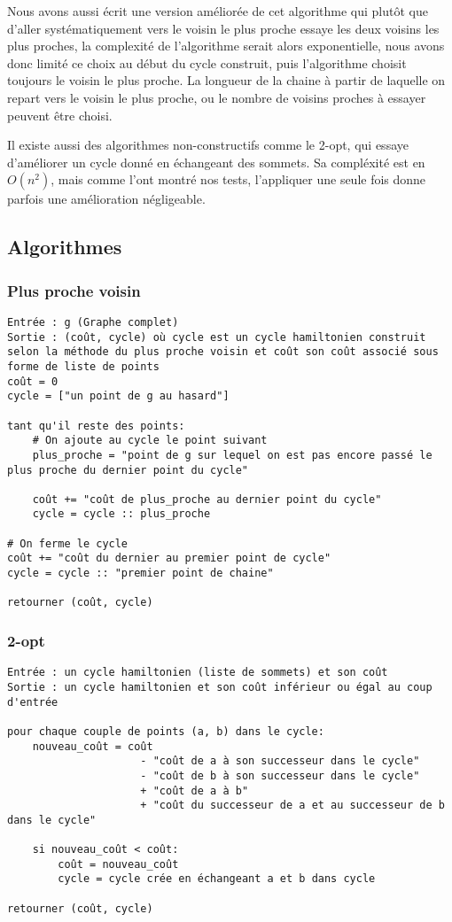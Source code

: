 \documentclass{scrartcl}
\begin{document}
    Nous avons aussi écrit une version améliorée de cet algorithme qui plutôt
    que d'aller systématiquement vers le voisin le plus proche essaye les deux
    voisins les plus proches, la complexité de l'algorithme serait alors
    exponentielle, nous avons donc limité ce choix au début du cycle construit,
    puis l'algorithme choisit toujours le voisin le plus proche. La longueur de
    la chaine à partir de laquelle on repart vers le voisin le plus proche, ou
    le nombre de voisins proches à essayer peuvent être choisi.

    Il existe aussi des algorithmes non-constructifs comme le 2-opt, qui essaye
    d'améliorer un cycle donné en échangeant des sommets. Sa compléxité est en
    $O(n^2)$, mais comme l'ont montré nos tests, l'appliquer une seule fois
    donne parfois une amélioration négligeable.

  \subsection{Algorithmes}
    \subsubsection{Plus proche voisin}
      \begin{lstlisting}
Entrée : g (Graphe complet)
Sortie : (coût, cycle) où cycle est un cycle hamiltonien construit selon la méthode du plus proche voisin et coût son coût associé sous forme de liste de points
coût = 0
cycle = ["un point de g au hasard"]

tant qu'il reste des points:
    # On ajoute au cycle le point suivant
    plus_proche = "point de g sur lequel on est pas encore passé le plus proche du dernier point du cycle"

    coût += "coût de plus_proche au dernier point du cycle"
    cycle = cycle :: plus_proche

# On ferme le cycle
coût += "coût du dernier au premier point de cycle"
cycle = cycle :: "premier point de chaine"

retourner (coût, cycle)
      \end{lstlisting}

    \subsubsection{2-opt}
      \begin{lstlisting}
Entrée : un cycle hamiltonien (liste de sommets) et son coût
Sortie : un cycle hamiltonien et son coût inférieur ou égal au coup d'entrée

pour chaque couple de points (a, b) dans le cycle:
    nouveau_coût = coût
                     - "coût de a à son successeur dans le cycle"
                     - "coût de b à son successeur dans le cycle"
                     + "coût de a à b"
                     + "coût du successeur de a et au successeur de b dans le cycle"

    si nouveau_coût < coût:
        coût = nouveau_coût
        cycle = cycle crée en échangeant a et b dans cycle

retourner (coût, cycle)
      \end{lstlisting}
\end{document}
